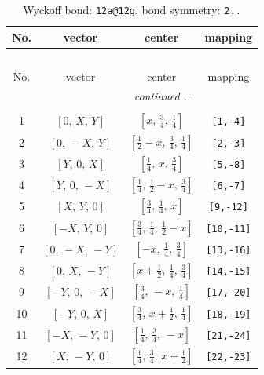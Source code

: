 \documentclass[fleqn,8pt]{jsarticle}
\begin{document}
\begin{longtable}{cccc}
\caption{Wyckoff bond: {\tt 12a@12g}, bond symmetry: {\tt 2..}}
 \\
 \hline \hline
No. & vector & center & mapping \\ \hline \endfirsthead

\multicolumn{3}{l}{\tablename\ \thetable{}} \\
 \hline \hline
No. & vector & center & mapping \\ \hline \endhead

 \hline \hline
\multicolumn{3}{r}{\footnotesize\it continued ...} \\ \endfoot

 \hline \hline
\multicolumn{3}{r}{} \\ \endlastfoot

1 & $\left[ 0,\, X,\, Y \right]$ & $\left[ x,\, \frac{3}{4},\, \frac{1}{4} \right]$ & {\tt [1,-4]} \\ \hline
2 & $\left[ 0,\, - X,\, Y \right]$ & $\left[ \frac{1}{2} - x,\, \frac{3}{4},\, \frac{1}{4} \right]$ & {\tt [2,-3]} \\ \hline
3 & $\left[ Y,\, 0,\, X \right]$ & $\left[ \frac{1}{4},\, x,\, \frac{3}{4} \right]$ & {\tt [5,-8]} \\ \hline
4 & $\left[ Y,\, 0,\, - X \right]$ & $\left[ \frac{1}{4},\, \frac{1}{2} - x,\, \frac{3}{4} \right]$ & {\tt [6,-7]} \\ \hline
5 & $\left[ X,\, Y,\, 0 \right]$ & $\left[ \frac{3}{4},\, \frac{1}{4},\, x \right]$ & {\tt [9,-12]} \\ \hline
6 & $\left[ - X,\, Y,\, 0 \right]$ & $\left[ \frac{3}{4},\, \frac{1}{4},\, \frac{1}{2} - x \right]$ & {\tt [10,-11]} \\ \hline
7 & $\left[ 0,\, - X,\, - Y \right]$ & $\left[ - x,\, \frac{1}{4},\, \frac{3}{4} \right]$ & {\tt [13,-16]} \\ \hline
8 & $\left[ 0,\, X,\, - Y \right]$ & $\left[ x + \frac{1}{2},\, \frac{1}{4},\, \frac{3}{4} \right]$ & {\tt [14,-15]} \\ \hline
9 & $\left[ - Y,\, 0,\, - X \right]$ & $\left[ \frac{3}{4},\, - x,\, \frac{1}{4} \right]$ & {\tt [17,-20]} \\ \hline
10 & $\left[ - Y,\, 0,\, X \right]$ & $\left[ \frac{3}{4},\, x + \frac{1}{2},\, \frac{1}{4} \right]$ & {\tt [18,-19]} \\ \hline
11 & $\left[ - X,\, - Y,\, 0 \right]$ & $\left[ \frac{1}{4},\, \frac{3}{4},\, - x \right]$ & {\tt [21,-24]} \\ \hline
12 & $\left[ X,\, - Y,\, 0 \right]$ & $\left[ \frac{1}{4},\, \frac{3}{4},\, x + \frac{1}{2} \right]$ & {\tt [22,-23]} \\
\end{longtable}
\end{document}

